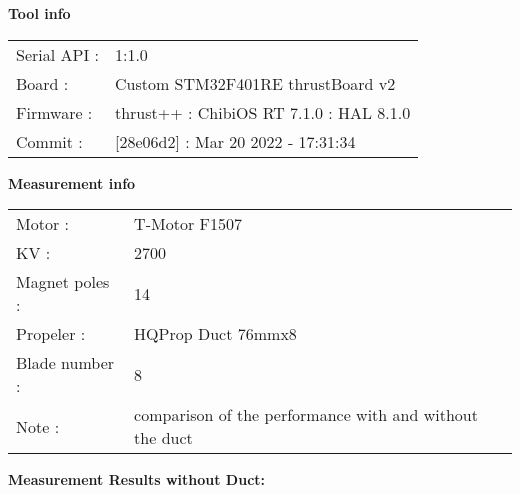 \documentclass[10pt]{article}
\begin{document}
\noindent
{\large \bf Tool info}
\vspace{3mm}

\noindent
\begin{tabular}{ll}
Serial API : 	&1:1.0  \\
Board	:		&Custom STM32F401RE thrustBoard v2  \\
Firmware :		&thrust++ : ChibiOS RT 7.1.0 : HAL 8.1.0  \\
Commit :		&[28e06d2] : Mar 20 2022 - 17:31:34
\end{tabular}
\vspace{3mm}

\noindent
{\large \bf Measurement info}
\vspace{3mm}

\noindent
\begin{tabular}{ll}
Motor : 		&T-Motor F1507  \\
KV : 			&2700  \\
Magnet poles : 	&14  \\

Propeler : 		&HQProp Duct 76mmx8 \\
Blade number : 	&8  \\
Note :			&comparison of the performance with and without the duct
\end{tabular}

\vspace{3mm}

\noindent
{\large \bf Measurement Results without Duct:}
\vspace{3mm}
\end{document}
